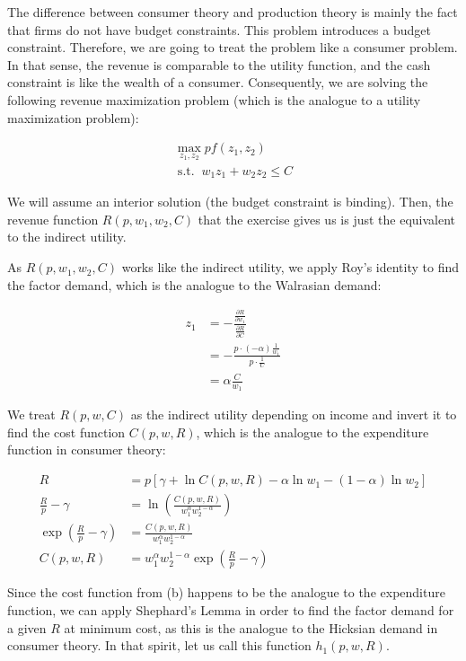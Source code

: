 {{The difference between consumer theory and production theory is mainly the fact that firms do not have budget constraints.
This problem introduces a budget constraint. Therefore, we are going to treat the problem like a consumer problem.
In that sense, the revenue is comparable to the utility function, and the cash constraint is like the wealth of a consumer.
Consequently, we are solving the following revenue maximization problem (which is the analogue to a utility maximization problem):

\begin{align*}
    \max_{z_1,z_2} pf(z_1,z_2) \\
    \operatorname{s.t.} \; w_1z_1 + w_2z_2 \leq C
\end{align*}

We will assume an interior solution (the budget constraint is binding).
Then, the revenue function $R(p, w_1, w_2, C)$ that the exercise gives us is just the equivalent to the indirect utility.

\begin{enumerate}[label=(\alph*)]
{\item 
As $R(p, w_1, w_2, C)$ works like the indirect utility, we apply Roy's identity to find the factor demand, which is the analogue to the Walrasian demand:

\begin{align*}
    z_1&=-\frac{\frac{\partial R}{\partial w_1}}{\frac{\partial R}{\partial C}} \\
    &= -\frac{p \cdot(-\alpha) \frac{1}{w_1}}{p \cdot \frac{1}{C}} \\
    &= \alpha \frac{C}{w_1}
\end{align*}
}
{\item 
We treat $R(p,w,C)$ as the indirect utility depending on income and invert it to find the cost function $C(p,w,R)$, which is the analogue to the expenditure function in consumer theory:

\begin{align*}
    R&=p\left[\gamma+\ln C(p,w,R)-\alpha \ln w_1-(1-\alpha) \ln w_2\right] \\
    \frac{R}{p}-\gamma &= \ln \left(\frac{C(p,w,R)}{w_1^\alpha w_2^{1-\alpha}} \right) \\
    \exp\left(\frac{R}{p}-\gamma\right)&=\frac{C(p,w,R)}{w_1^\alpha w_2^{1-\alpha}} \\
    C(p,w,R) &= w_1^\alpha w_2^{1-\alpha}\exp\left(\frac{R}{p}-\gamma\right)
\end{align*}
}
{\item 
Since the cost function from (b) happens to be the analogue to the expenditure function, we can apply Shephard's Lemma in order to find the factor demand for a given $R$ at minimum cost, as this is the analogue to the Hicksian demand in consumer theory.
In that spirit, let us call this function $h_1(p,w,R)$.

}
\end{enumerate}}}
